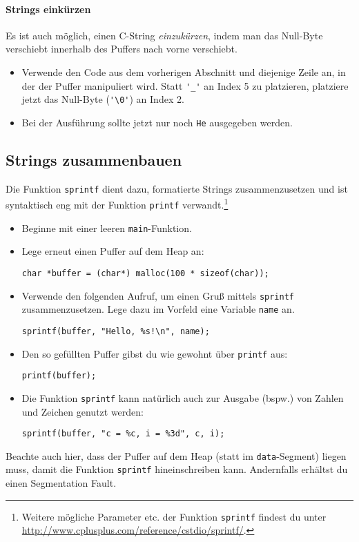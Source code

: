 \paragraph{Strings einkürzen}
Es ist auch möglich, einen C-String \emph{einzukürzen}, indem man das Null-Byte verschiebt innerhalb des Puffers nach vorne verschiebt.
\begin{itemize}
\item
Verwende den Code aus dem vorherigen Abschnitt und diejenige Zeile an, in der der Puffer manipuliert wird.
Statt \lstinline|'_'| an Index 5 zu platzieren, platziere jetzt das Null-Byte (\lstinline|'\0'|) an Index 2.
\item 
Bei der Ausführung sollte jetzt nur noch \texttt{He} ausgegeben werden.
\end{itemize}

\subsection{Strings zusammenbauen}

Die Funktion \lstinline{sprintf} dient dazu, formatierte Strings zusammenzusetzen und ist syntaktisch eng mit der Funktion \lstinline{printf} verwandt.\footnote{Weitere mögliche Parameter etc. der Funktion \lstinline{sprintf} findest du unter \url{http://www.cplusplus.com/reference/cstdio/sprintf/}.}
%
\begin{itemize}
\item
Beginne mit einer leeren \lstinline|main|-Funktion.
\item 
Lege erneut einen Puffer auf dem Heap an:

\begin{minipage}{.96\textwidth}
\begin{lstlisting}
char *buffer = (char*) malloc(100 * sizeof(char));
\end{lstlisting}
\end{minipage}

\item 
Verwende den folgenden Aufruf, um einen Gruß mittels \lstinline|sprintf| zusammenzusetzen.
Lege dazu im Vorfeld eine Variable \lstinline|name| an.
\begin{lstlisting}
sprintf(buffer, "Hello, %s!\n", name);
\end{lstlisting}
\item 
Den so gefüllten Puffer gibst du wie gewohnt über \lstinline|printf| aus:
\begin{lstlisting}
printf(buffer);
\end{lstlisting}
\item 
Die Funktion \lstinline|sprintf| kann natürlich auch zur Ausgabe (bspw.) von Zahlen und Zeichen genutzt werden:
\begin{lstlisting}
sprintf(buffer, "c = %c, i = %3d", c, i);
\end{lstlisting}
\end{itemize}
Beachte auch hier, dass der Puffer auf dem Heap (statt im \texttt{data}-Segment) liegen muss, damit die Funktion \lstinline|sprintf| hineinschreiben kann.
Andernfalls erhältst du einen Segmentation Fault.

